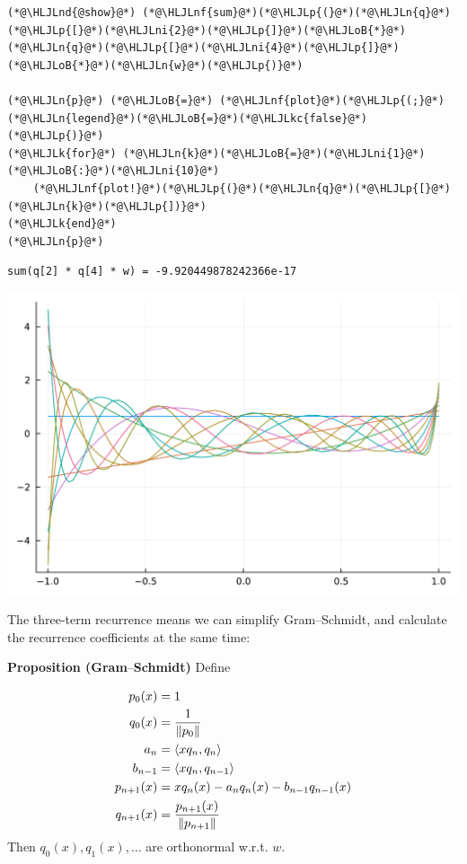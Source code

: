 \documentclass[12pt,a4paper]{article}
\newcommand{\HLJLk}[1]{\textcolor[RGB]{148,91,176}{\textbf{#1}}}
\newcommand{\HLJLkc}[1]{\textcolor[RGB]{59,151,46}{\textit{#1}}}
\newcommand{\HLJLn}[1]{#1}
\newcommand{\HLJLnd}[1]{\textcolor[RGB]{214,102,97}{#1}}
\newcommand{\HLJLnf}[1]{\textcolor[RGB]{66,102,213}{#1}}
\newcommand{\HLJLni}[1]{\textcolor[RGB]{59,151,46}{#1}}
\newcommand{\HLJLoB}[1]{\textcolor[RGB]{102,102,102}{\textbf{#1}}}
\newcommand{\HLJLp}[1]{#1}
\def\endash{–}
\begin{document}
\begin{lstlisting}
(*@\HLJLnd{@show}@*) (*@\HLJLnf{sum}@*)(*@\HLJLp{(}@*)(*@\HLJLn{q}@*)(*@\HLJLp{[}@*)(*@\HLJLni{2}@*)(*@\HLJLp{]}@*)(*@\HLJLoB{*}@*)(*@\HLJLn{q}@*)(*@\HLJLp{[}@*)(*@\HLJLni{4}@*)(*@\HLJLp{]}@*)(*@\HLJLoB{*}@*)(*@\HLJLn{w}@*)(*@\HLJLp{)}@*)

(*@\HLJLn{p}@*) (*@\HLJLoB{=}@*) (*@\HLJLnf{plot}@*)(*@\HLJLp{(;}@*) (*@\HLJLn{legend}@*)(*@\HLJLoB{=}@*)(*@\HLJLkc{false}@*)(*@\HLJLp{)}@*)
(*@\HLJLk{for}@*) (*@\HLJLn{k}@*)(*@\HLJLoB{=}@*)(*@\HLJLni{1}@*)(*@\HLJLoB{:}@*)(*@\HLJLni{10}@*)
    (*@\HLJLnf{plot!}@*)(*@\HLJLp{(}@*)(*@\HLJLn{q}@*)(*@\HLJLp{[}@*)(*@\HLJLn{k}@*)(*@\HLJLp{])}@*)
(*@\HLJLk{end}@*)
(*@\HLJLn{p}@*)
\end{lstlisting}

\begin{lstlisting}
sum(q[2] * q[4] * w) = -9.920449878242366e-17
\end{lstlisting}

\includegraphics[width=\linewidth]{jl_hpkPoK/OP_methods_test_7_1.pdf}

The three-term recurrence means we can simplify Gram\ensuremath{\endash}Schmidt, and calculate the recurrence coefficients at the same time:

\textbf{Proposition (Gram\ensuremath{\endash}Schmidt)} Define


\begin{align*}
p_0(x) &= 1 \\
q_0(x) &= {1 \over \| p_0\|}\\
a_n &= \langle x q_n, q_n \rangle \\
b_{n-1} &= \langle x q_n, q_{n-1}\rangle\\
p_{n+1}(x) &= x q_n(x) -  a_n q_n(x) -  b_{n-1} q_{n-1}(x)\\
q_{n+1}(x) &= {p_{n+1}(x) \over \|p_{n+1}\|}
\end{align*}
Then $q_0(x), q_1(x), \ldots$ are orthonormal w.r.t. $w$.
\end{document}
